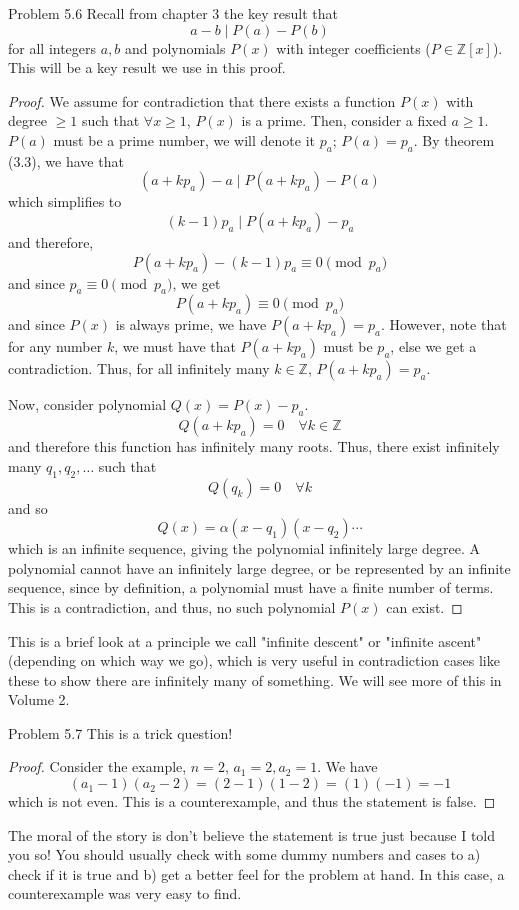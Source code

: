\begin{sol}{Problem 5.6}
Recall from chapter 3 the key result that
\[
a - b \mid P(a) - P(b)
\]
for all integers $a, b$ and polynomials $P(x)$ with integer coefficients ($P \in \mathbb{Z}[x]$). This will be a key result we use in this proof.
\begin{proof}
We assume for contradiction that there exists a function $P(x)$ with degree $\geq 1$ such that $\forall x \geq 1$, $P(x)$ is a prime. Then, consider a fixed $a \geq 1$. $P(a)$ must be a prime number, we will denote it $p_a$; $P(a) = p_a$. By theorem (3.3), we have that
\[
(a + kp_a) - a \mid P(a + kp_a) - P(a)
\]
which simplifies to 
\[
(k-1)p_a \mid P(a + kp_a) - p_a
\]
and therefore, 
\[
P(a + kp_a) - (k-1)p_a \equiv 0 \pmod{p_a}
\]
and since $p_a \equiv 0 \pmod{p_a}$, we get
\[
P(a + kp_a) \equiv 0 \pmod{p_a}
\]
and since $P(x)$ is always prime, we have $P(a + kp_a) = p_a$. However, note that for any number $k$, we must have that $P(a + kp_a)$ must be $p_a$, else we get a contradiction. Thus, for all infinitely many $k \in \mathbb{Z}$, $P(a + kp_a) = p_a$. 

Now, consider polynomial $Q(x) = P(x) - p_a$.
\[
Q (a  + kp_a) = 0 \quad \forall k \in \mathbb{Z}
\]
and therefore this function has infinitely many roots. Thus, there exist infinitely many $q_1, q_2, \ldots$ such that
\[
Q(q_k) = 0 \quad \forall k
\]
and so 
\[
Q(x) = \alpha (x - q_1)(x-q_2)\cdots
\]
which is an infinite sequence, giving the polynomial infinitely large degree. A polynomial cannot have an infinitely large degree, or be represented by an infinite sequence, since by definition, a polynomial must have a finite number of terms. This is a contradiction, and thus, no such polynomial $P(x)$ can exist.
\end{proof}

This is a brief look at a principle we call "infinite descent" or "infinite ascent" (depending on which way we go), which is very useful in contradiction cases like these to show there are infinitely many of something. We will see more of this in Volume 2. 
\end{sol}

\begin{sol}{Problem 5.7}
This is a trick question!
\begin{proof}
Consider the example, $n = 2$, $a_1 = 2, a_2 = 1$. We have
\[
(a_1-1)(a_2-2) = (2-1)(1-2) = (1)(-1) = -1
\]
which is not even. This is a counterexample, and thus the statement is false.
\end{proof}
The moral of the story is don't believe the statement is true just because I told you so! You should usually check with some dummy numbers and cases to a) check if it is true and b) get a better feel for the problem at hand. In this case, a counterexample was very easy to find. 
\end{sol}

